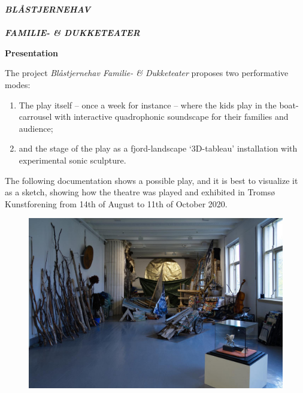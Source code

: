
{}

{\LARGE \textsl{\textbf{BL\AA STJERNEHAV \\ \\ FAMILIE- \& DUKKETEATER}}}

\label{psh}

\vspace{\fill}

{\Large \textbf{Presentation}}

\bigskip
\bigskip

The project \textsl{Bl\aa stjernehav Familie- \& Dukketeater} proposes two performative modes: 
\begin{enumerate}
\item The play itself -- once a week for instance -- where the kids play in the boat-carrousel with interactive quadrophonic soundscape for their families and audience;
\item and the stage of the play as a fjord-landscape `3D-tableau' installation with experimental sonic sculpture.
\end{enumerate}

\bigskip

The following documentation shows a possible play, and it is best to visualize it as a sketch, showing how the theatre was played and exhibited in Troms\o{} Kunstforening from 14th of August to 11th of October 2020. 

\bigskip

\begin{figure}[h]
		\includegraphics[width=\textwidth]{mp/img/img1}
		\label{sh}
\end{figure}

